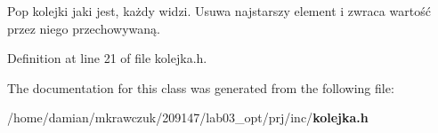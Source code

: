 Pop kolejki jaki jest, każdy widzi. Usuwa najstarszy element i zwraca wartość przez niego przechowywaną. 



Definition at line 21 of file kolejka.\-h.



The documentation for this class was generated from the following file\-:\begin{DoxyCompactItemize}
\item 
/home/damian/mkrawczuk/209147/lab03\-\_\-opt/prj/inc/{\bf kolejka.\-h}\end{DoxyCompactItemize}
